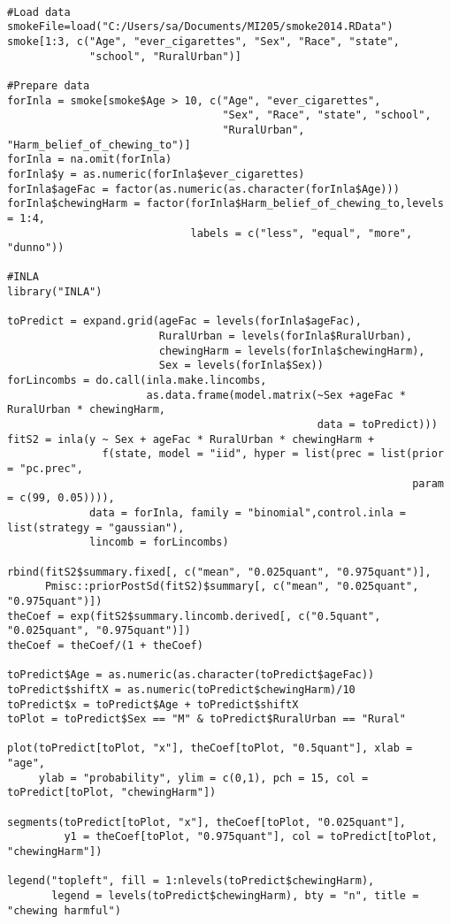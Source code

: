 \documentclass[
  12pt,
]{article}
\begin{document}
\begin{verbatim}

#Load data
smokeFile=load("C:/Users/sa/Documents/MI205/smoke2014.RData")
smoke[1:3, c("Age", "ever_cigarettes", "Sex", "Race", "state", 
             "school", "RuralUrban")]

#Prepare data
forInla = smoke[smoke$Age > 10, c("Age", "ever_cigarettes", 
                                  "Sex", "Race", "state", "school", 
                                  "RuralUrban", "Harm_belief_of_chewing_to")]
forInla = na.omit(forInla)
forInla$y = as.numeric(forInla$ever_cigarettes)
forInla$ageFac = factor(as.numeric(as.character(forInla$Age))) 
forInla$chewingHarm = factor(forInla$Harm_belief_of_chewing_to,levels = 1:4, 
                             labels = c("less", "equal", "more", "dunno"))

#INLA
library("INLA")

toPredict = expand.grid(ageFac = levels(forInla$ageFac), 
                        RuralUrban = levels(forInla$RuralUrban), 
                        chewingHarm = levels(forInla$chewingHarm), 
                        Sex = levels(forInla$Sex))
forLincombs = do.call(inla.make.lincombs, 
                      as.data.frame(model.matrix(~Sex +ageFac * RuralUrban * chewingHarm, 
                                                 data = toPredict))) 
fitS2 = inla(y ~ Sex + ageFac * RuralUrban * chewingHarm + 
               f(state, model = "iid", hyper = list(prec = list(prior = "pc.prec", 
                                                                param = c(99, 0.05)))), 
             data = forInla, family = "binomial",control.inla = list(strategy = "gaussian"), 
             lincomb = forLincombs)

rbind(fitS2$summary.fixed[, c("mean", "0.025quant", "0.975quant")], 
      Pmisc::priorPostSd(fitS2)$summary[, c("mean", "0.025quant", "0.975quant")])
theCoef = exp(fitS2$summary.lincomb.derived[, c("0.5quant", "0.025quant", "0.975quant")])
theCoef = theCoef/(1 + theCoef)

toPredict$Age = as.numeric(as.character(toPredict$ageFac)) 
toPredict$shiftX = as.numeric(toPredict$chewingHarm)/10 
toPredict$x = toPredict$Age + toPredict$shiftX
toPlot = toPredict$Sex == "M" & toPredict$RuralUrban == "Rural"

plot(toPredict[toPlot, "x"], theCoef[toPlot, "0.5quant"], xlab = "age", 
     ylab = "probability", ylim = c(0,1), pch = 15, col = toPredict[toPlot, "chewingHarm"]) 

segments(toPredict[toPlot, "x"], theCoef[toPlot, "0.025quant"],
         y1 = theCoef[toPlot, "0.975quant"], col = toPredict[toPlot, "chewingHarm"])

legend("topleft", fill = 1:nlevels(toPredict$chewingHarm), 
       legend = levels(toPredict$chewingHarm), bty = "n", title = "chewing harmful")

\end{verbatim}
\end{document}
